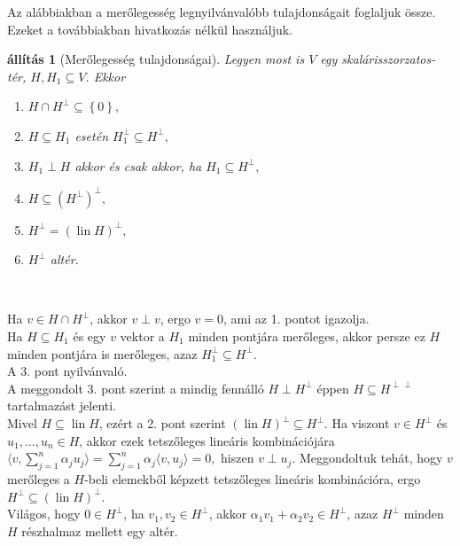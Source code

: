 \documentclass[a4paper, showtrims]{memoir}
\makeatletter
\renewenvironment{proof}[1][\proofname]
    {\par\pushQED{\qed}%
    \normalfont \topsep6\p@\@plus6\p@\relax
    \trivlist
    \item[\hskip\labelsep
        \itshape
    #1\@addpunct{:}]\ignorespaces}
    {\popQED\endtrivlist\@endpefalse}
\theoremstyle{plain}
\newtheorem{proposition}{állítás}[chapter]
\theoremstyle{remark}
\theoremstyle{definition}
\DeclareMathOperator{\lin}{lin}
\newcommand{\ip}[2]{\langle#1,#2\rangle}
\makeatother
\begin{document}
Az alábbiakban a merőlegesség legnyilvánvalóbb tulajdonságait foglaljuk össze.
Ezeket a továbbiakban hivatkozás nélkül használjuk.
\begin{proposition}[Merőlegesség tulajdonságai]
	Legyen most is $V$ egy skalárisszorzatos-tér, $H,H_1\subseteq V$.
	Ekkor
	\begin{enumerate}
		\item $H\cap H^{\perp}\subseteq\left\{ 0 \right\},$
		\item $H\subseteq H_1$ esetén $H_1^\perp\subseteq H^\perp,$
        \item $H_1\perp H$ akkor és csak akkor, ha $H_1\subseteq H^\perp,$
		\item $H\subseteq \left( H^\perp \right)^\perp,$
		\item $H^{\perp}=\left( \lin H \right)^\perp,$
		\item $H^\perp$ altér.\qedhere
	\end{enumerate}
\end{proposition}\
\begin{proof}
	Ha $v\in H\cap H^\perp$, akkor $v\perp v$, ergo $v=0$, ami az 1. pontot igazolja.
\\
	Ha $H\subseteq H_1$ és egy $v$ vektor a $H_1$ minden pontjára merőleges, 
    akkor persze ez $H$ minden pontjára is merőleges, azaz $H_1^\perp\subseteq H^\perp$.
\\
    A 3. pont nyilvánvaló.
\\
    A meggondolt 3. pont szerint a mindig fennálló $H\perp H^\perp$ éppen $H\subseteq H^{\perp\perp}$
    tartalmazást jelenti.
\\
    Mivel $H\subseteq \lin H$, ezért a 2. pont szerint $(\lin H)^\perp\subseteq H^\perp$.
	Ha viszont $v\in H^\perp$ és $u_1,\ldots,u_n\in H$, akkor ezek tetszőleges lineáris kombinációjára
	\begin{math}
		\ip{v}{\sum_{j=1}^n\alpha_ju_j}
		=
		\sum_{j=1}^n\alpha_j\ip{v}{u_j}
		=
		0,
	\end{math}
	hiszen $v\perp u_j$.
	Meggondoltuk tehát, hogy $v$ merőleges a $H$-beli elemekből képzett tetszőleges lineáris kombinációra,
	ergo $H^\perp\subseteq\left( \lin H \right)^\perp.$
    \\
	Világos, hogy $0\in H^\perp$, ha $v_1,v_2\in H^\perp$, akkor $\alpha_1v_1+\alpha_2v_2\in H^\perp$, azaz
	$H^\perp$ minden $H$ részhalmaz mellett egy altér.
\end{proof}
\end{document}
